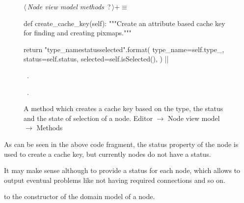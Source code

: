 \documentclass[%
    a4paper,    %
    justified,  %
    nobib,      %
    openany     %
]{tufte-book}
\begin{document}
\begin{figure}
\begin{flushleft} \small
\begin{minipage}{\linewidth}\label{scrap75}\raggedright\small
{} $\langle\,${\itshape Node view model methods}\nobreak\ {\footnotesize {?}}$\,\rangle+\equiv$
\vspace{-1ex}
\begin{pythoncode}
def create_cache_key(self):
    """Create an attribute based cache key for finding and creating
    pixmaps."""

    return "{type_name}{status}{selected}".format(
        type_name=self.type_,
        status=self.status,
        selected=self.isSelected(),
    )
|\NWsep|
\end{pythoncode}
\vspace{1.5ex}
\footnotesize
\begin{list}{}{\setlength{\itemsep}{-\parsep}\setlength{\itemindent}{-\leftmargin}}
\item \NWtxtMacroDefBy\ .
\item \NWtxtMacroRefIn\ .

\item{}
\end{list}
\end{minipage}\vspace{4ex}
\end{flushleft}
\caption{A method which creates a cache key based on the type, the status and
  the state of selection of a node.
  \newline{}\newline{}Editor $\rightarrow$ Node view model $\rightarrow$
  Methods}
\label{editor:lst:node-view-model:methods:create-cache-key}
\end{figure}

As can be seen in the above code fragment, the status property of the node is
used to create a cache key, but currently nodes do not have a status.

It may make sense although to provide a status for each node, which allows to
output eventual problems like not having required connections and so on.

 to the constructor of the domain model of a node.
\end{document}
